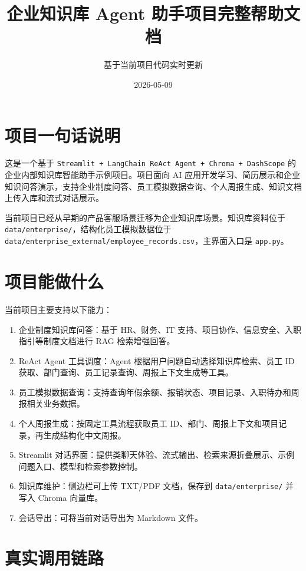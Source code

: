 \documentclass[UTF8,zihao=-4]{ctexart}
\title{企业知识库 Agent 助手项目完整帮助文档}
\author{基于当前项目代码实时更新}
\date{2026-05-09}
\begin{document}
\maketitle
\tableofcontents
\newpage

\section{项目一句话说明}

这是一个基于 \texttt{Streamlit + LangChain ReAct Agent + Chroma + DashScope} 的企业内部知识库智能助手示例项目。项目面向 AI 应用开发学习、简历展示和企业知识问答演示，支持企业制度问答、员工模拟数据查询、个人周报生成、知识文档上传入库和流式对话展示。

当前项目已经从早期的产品客服场景迁移为企业知识库场景。知识库资料位于 \texttt{data/enterprise/}，结构化员工模拟数据位于 \texttt{data/enterprise\_external/employee\_records.csv}，主界面入口是 \texttt{app.py}。

\section{项目能做什么}

当前项目主要支持以下能力：

\begin{enumerate}
\item 企业制度知识库问答：基于 HR、财务、IT 支持、项目协作、信息安全、入职指引等制度文档进行 RAG 检索增强回答。
\item ReAct Agent 工具调度：Agent 根据用户问题自动选择知识库检索、员工 ID 获取、部门查询、员工记录查询、周报上下文生成等工具。
\item 员工模拟数据查询：支持查询年假余额、报销状态、项目记录、入职待办和周报相关业务数据。
\item 个人周报生成：按固定工具流程获取员工 ID、部门、周报上下文和项目记录，再生成结构化中文周报。
\item Streamlit 对话界面：提供类聊天体验、流式输出、检索来源折叠展示、示例问题入口、模型和检索参数控制。
\item 知识库维护：侧边栏可上传 TXT/PDF 文档，保存到 \texttt{data/enterprise/} 并写入 Chroma 向量库。
\item 会话导出：可将当前对话导出为 Markdown 文件。
\end{enumerate}

\section{真实调用链路}
\end{document}
